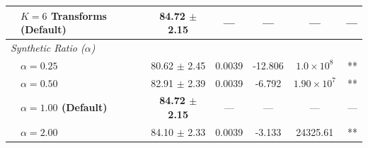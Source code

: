 \begin{table}[t]
\begin{tabular}{llccccr}
  & \textbf{$K = 6$ Transforms (Default)} & \textbf{84.72 $\pm$ 2.15} & --- & --- & --- & --- \\
\midrule
\multicolumn{7}{l}{\textit{Synthetic Ratio ($\alpha$)}} \\
  & $\alpha = 0.25$ & 80.62 $\pm$ 2.45 & 0.0039 & -12.806 & $1.0\times 10^8$ & ** \\
  & $\alpha = 0.50$ & 82.91 $\pm$ 2.39 & 0.0039 & -6.792 & $1.90\times 10^7$ & ** \\
  & \textbf{$\alpha = 1.00$ (Default)} & \textbf{84.72 $\pm$ 2.15} & --- & --- & --- & --- \\
  & $\alpha = 2.00$ & 84.10 $\pm$ 2.33 & 0.0039 & -3.133 & 24325.61 & ** \\
\bottomrule
\end{tabular}
\end{table}
